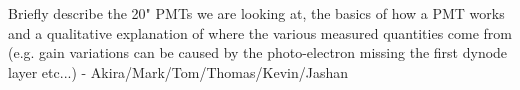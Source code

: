 
Briefly describe the 20" PMTs we are looking at, the basics of how a PMT works and a qualitative explanation of where the various measured quantities come from (e.g. gain variations can be caused by the photo-electron missing the first dynode layer etc...) - Akira/Mark/Tom/Thomas/Kevin/Jashan
